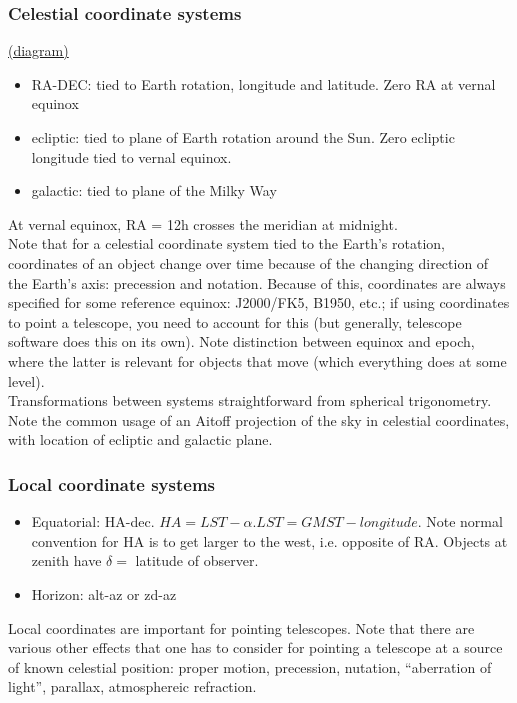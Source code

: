 \documentclass[12pt]{article}
\begin{document}
\subsubsection*{Celestial coordinate systems}
\textcolor{blue}
{\href{http://csep10.phys.utk.edu/astr161/lect/time/coordinates.html}{(diagram)}}
\begin{itemize}
    \item RA-DEC: tied to Earth rotation, longitude and latitude.
        Zero RA at vernal equinox
    \item ecliptic: tied to plane of Earth rotation around the Sun.
        Zero ecliptic longitude tied to vernal equinox.
    \item galactic: tied to plane of the Milky Way
\end{itemize}

\noindent At vernal equinox, RA = 12h crosses the meridian at midnight.\\

\noindent Note that for a celestial coordinate system tied to the Earth's rotation,
coordinates of an object change over time because of the changing direction
of the Earth's axis: precession and notation. Because of this, coordinates are
always specified for some reference equinox: J2000/FK5, B1950, etc.; if using
coordinates to point a telescope, you need to account for this (but generally,
telescope software does this on its own). Note distinction between equinox and
epoch, where the latter is relevant for objects that move (which everything does
at some level).\\ \noindent Transformations between systems straightforward from spherical
trigonometry.\\

\noindent Note the common usage of an Aitoff projection of the sky in celestial
coordinates, with location of ecliptic and galactic plane.

\subsubsection*{Local coordinate systems}
\begin{itemize}
    \item Equatorial: HA-dec. $HA=LST - \alpha. LST=GMST - longitude$.
        Note normal convention for HA is to get larger to the west, i.e.
        opposite of RA. Objects at zenith have $\delta=$ latitude of observer.
    \item Horizon: alt-az or zd-az
\end{itemize}
Local coordinates are important for pointing telescopes. Note that there are
various other effects that one has to consider for pointing a telescope at a
source of known celestial position: proper motion, precession, nutation,
``aberration of light'', parallax, atmosphereic refraction.
\end{document}
